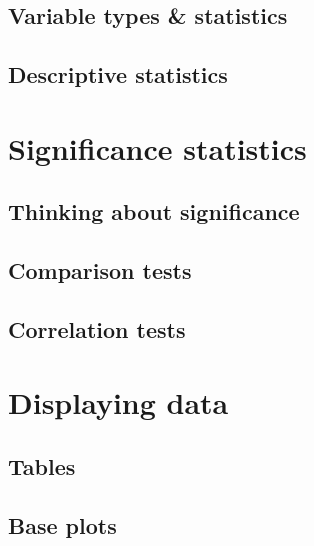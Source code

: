\documentclass[
]{book}
\begin{document}
\hypertarget{variable-types-statistics}{%
\section{Variable types \& statistics}\label{variable-types-statistics}}

\hypertarget{descriptive-statistics}{%
\section{Descriptive statistics}\label{descriptive-statistics}}

\hypertarget{significance-statistics}{%
\chapter{Significance statistics}\label{significance-statistics}}

\hypertarget{thinking-about-significance}{%
\section{Thinking about significance}\label{thinking-about-significance}}

\hypertarget{comparison-tests}{%
\section{Comparison tests}\label{comparison-tests}}

\hypertarget{correlation-tests}{%
\section{Correlation tests}\label{correlation-tests}}

\hypertarget{displaying-data}{%
\chapter{Displaying data}\label{displaying-data}}

\hypertarget{tables}{%
\section{Tables}\label{tables}}

\hypertarget{base-plots-1}{%
\section{Base plots}\label{base-plots-1}}
\end{document}
